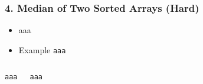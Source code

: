 \begin{frame}[fragile]\frametitle{4. Median of Two Sorted Arrays (Hard)}

	\begin{itemize}
	\item aaa
	\item Example \lstinline|aaa|
	\end{itemize}
	
	\begin{columns}[T]
		\begin{lstlisting}[basicstyle=\scriptsize]
aaa
		\end{lstlisting}
		\begin{lstlisting}[basicstyle=\scriptsize]
aaa
				\end{lstlisting}		
	\end{columns}
	
	
\end{frame}


